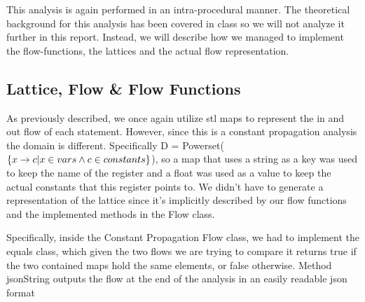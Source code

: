 This analysis is again performed in an intra-procedural manner. The theoretical background for this analysis has been covered in class so we will not analyze it further in this report. Instead, we will describe how we managed to implement the flow-functions, the lattices and the actual flow representation. 


\subsection{Lattice, Flow \& Flow Functions}
As previously described, we once again utilize stl maps to represent the in and out flow of each statement. However, since this is a constant propagation analysis the domain is different. Specifically D = Powerset($\{x\rightarrow c|x\in vars \wedge c\in constants\}$), so a map that uses a string as a key was used to keep the name of the register and a float was used as a value to keep the actual constants that this register points to. We didn't have to generate a representation of the lattice since it's implicitly described by our flow functions and the implemented methods in the Flow class.

Specifically, inside the Constant Propagation Flow class, we had to implement the equals class, which given the two flows we are trying to compare it returns true if the two contained maps hold the same elements, or false otherwise. Method jsonString outputs the flow at the end of the analysis in an easily readable json format

